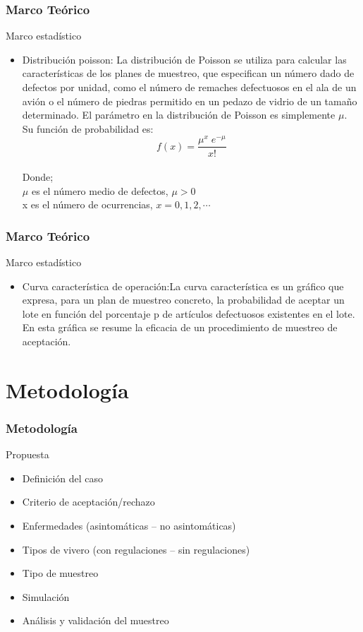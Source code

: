 \documentclass[10pt]{beamer}
\begin{document}
\begin{frame}
\frametitle{Marco Teórico}
\begin{block}{Marco estadístico}
\begin{itemize}
\justifying
\item Distribución poisson: La distribución de Poisson se utiliza para calcular las características de los planes de muestreo, que especifican un número dado de defectos por unidad, como el número de remaches defectuosos en el ala de un avión o el número de piedras permitido en un pedazo de vidrio de un tamaño determinado. El parámetro en la distribución de Poisson es simplemente $\mu$. Su función de probabilidad es:
$$f(x)=\frac{{\mu}^x \; e^{-\mu}}{x!}$$
~\\ Donde; 
~\\ $\mu$ es el número medio de defectos, $\mu>0$
~\\ x es el número de ocurrencias, $x=0,1,2,\cdots$
\end{itemize}
\end{block}
\end{frame}

\begin{frame}
\frametitle{Marco Teórico}
\begin{block}{Marco estadístico}
\begin{itemize}
\justifying
\item Curva característica de operación:La curva característica es un gráfico que expresa, para un plan de muestreo concreto, la probabilidad de aceptar un lote en función del porcentaje p de artículos defectuosos existentes en el lote. En esta gráfica se resume la eficacia de un procedimiento de muestreo de aceptación.
\end{itemize}
\end{block}
\end{frame}

\section{Metodología}
\begin{frame}
\frametitle{Metodología}
\begin{block}{Propuesta}
\begin{itemize}
\item Definición del caso
\item Criterio de aceptación/rechazo
\item Enfermedades (asintomáticas – no asintomáticas)
\item Tipos de vivero (con regulaciones – sin regulaciones)
\item Tipo de muestreo
\item Simulación
\item Análisis y validación del muestreo
\end{itemize}
\end{block}
\end{frame}


  
\end{document}
